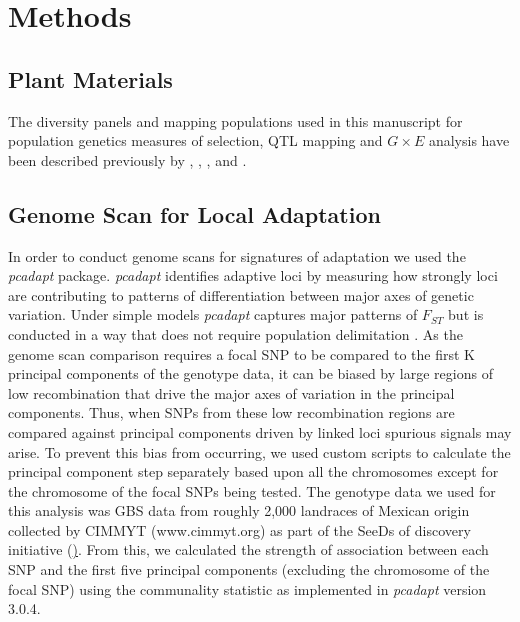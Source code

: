 \section{Methods}

\subsection{Plant Materials}
The diversity panels and mapping populations used in this manuscript for population genetics measures of selection, QTL mapping and $G \times E$ analysis have been described previously by \citep{wang2020-mp}, \citep{gates2019-xu}, \citep{romero_navarro2017-cn}, \citep{janzen2021-lz} and \citep{perez-limon2022}. 

\subsection{Genome Scan for Local Adaptation}
In order to conduct genome scans for signatures of adaptation we used the \textit{pcadapt} \citep{luu2017-ws} package.
\textit{pcadapt} identifies adaptive loci by measuring how strongly loci are contributing to patterns of differentiation between major axes of genetic variation.
Under simple models \textit{pcadapt} captures major patterns of $F_{ST}$  but is conducted in a way that does not require population delimitation \citep{duforet2014genome}.
As the genome scan comparison requires a focal SNP to be compared to the first K principal components of the genotype data, it can be biased by large regions of low recombination that drive the major axes of variation in the principal components.
Thus, when SNPs from these low recombination regions are compared against principal components driven by linked loci spurious signals may arise.
To prevent this bias from occurring, we used custom scripts to calculate the principal component step separately based upon all the chromosomes except for the chromosome of the focal SNPs being tested.
The genotype data we used for this analysis was GBS data from roughly 2,000 landraces of Mexican origin collected by CIMMYT (www.cimmyt.org) as part of the SeeDs of discovery initiative (\href{https://www.cimmyt.org/projects/seeds-of-discovery-seed/}).
From this, we calculated the strength of association between each SNP and the first five principal components (excluding the chromosome of the focal SNP) using the communality statistic as implemented in \textit{pcadapt} version 3.0.4.


